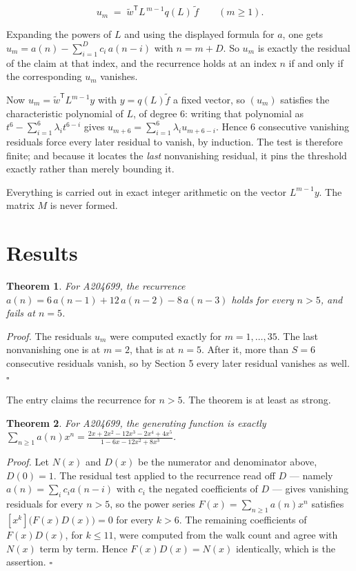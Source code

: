 \documentclass[11pt]{article}
\newtheorem{theorem}{Theorem}
\theoremstyle{definition}
\begin{document}
\[u_m \;=\; \tilde w^{\mathsf T} L^{\,m-1} q(L)\,\tilde f \qquad (m \ge 1).\]

Expanding the powers of $L$ and using the displayed formula for $a$, one gets $u_m = a(n) - \sum_{i=1}^{D} c_i\,a(n-i)$ with $n = m + D$. So $u_m$ is exactly the residual of the claim at that index, and the recurrence holds at an index $n$ if and only if the corresponding $u_m$ vanishes.

Now $u_m = \tilde w^{\mathsf T} L^{m-1} y$ with $y = q(L)\tilde f$ a fixed vector, so $(u_m)$ satisfies the characteristic polynomial of $L$, of degree $6$: writing that polynomial as $t^{6} - \sum_{i=1}^{6} \lambda_i t^{6-i}$ gives $u_{m+6} = \sum_{i=1}^{6} \lambda_i u_{m+6-i}$. Hence $6$ consecutive vanishing residuals force every later residual to vanish, by induction. The test is therefore finite; and because it locates the {\itshape last} nonvanishing residual, it pins the threshold exactly rather than merely bounding it.

Everything is carried out in exact integer arithmetic on the vector $L^{m-1}y$. The matrix $M$ is never formed.

\section{Results}

\begin{theorem} For A204699, the recurrence $a(n) = 6\,a(n-1) + 12\,a(n-2) - 8\,a(n-3)$ holds for every $n > 5$, and fails at $n = 5$.\end{theorem}

{\itshape Proof.} The residuals $u_m$ were computed exactly for $m = 1,\dots,35$. The last nonvanishing one is at $m = 2$, that is at $n = 5$. After it, more than $S = 6$ consecutive residuals vanish, so by Section 5 every later residual vanishes as well. $\square$

The entry claims the recurrence for $n > 5$. The theorem is at least as strong.

\begin{theorem} For A204699, the generating function is exactly $\sum_{n\ge 1} a(n)x^n = \frac{2x + 2x^{2} - 12x^{3} - 2x^{4} + 4x^{5}}{1 - 6x - 12x^{2} + 8x^{3}}$.\end{theorem}

{\itshape Proof.} Let $N(x)$ and $D(x)$ be the numerator and denominator above, $D(0)=1$. The residual test applied to the recurrence read off $D$ --- namely $a(n) = \sum_i c_i a(n-i)$ with $c_i$ the negated coefficients of $D$ --- gives vanishing residuals for every $n > 5$, so the power series $F(x)=\sum_{n\ge 1}a(n)x^n$ satisfies $[x^k]\bigl(F(x)D(x)\bigr) = 0$ for every $k > 6$. The remaining coefficients of $F(x)D(x)$, for $k \le 11$, were computed from the walk count and agree with $N(x)$ term by term. Hence $F(x)D(x) = N(x)$ identically, which is the assertion. $\square$
\end{document}
